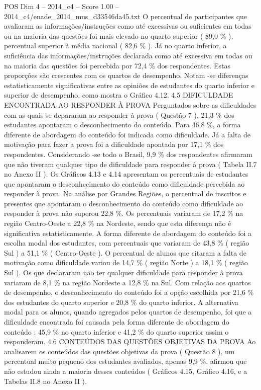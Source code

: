 \begin{textsample}{POS Dim 4 – 2014\_c4 – Score 1.00 – 2014\_c4/enade\_2014\_mus\_d33546da45.txt}
O percentual de participantes que avaliaram as informações/instruções como até excessivas ou suficientes em todas ou na maioria das questões foi mais elevado no quarto superior ( 89,0 \% ), percentual superior à média nacional ( 82,6 \% ).
Já no quarto inferior, a suficiência das informações/instruções declarada como até excessiva em todas ou na maioria das questões foi percebida por 72,4 \% dos respondentes.
Estas proporções são crescentes com os quartos de desempenho.
Notam -se diferenças estatisticamente significativas entre as opiniões de estudantes do quarto inferior e superior de desempenho, como mostra o Gráfico 4.12. 4.5 DIFICULDADE ENCONTRADA AO RESPONDER À PROVA Perguntados sobre as dificuldades com as quais se depararam ao responder à prova ( Questão 7 ), 21,3 \% dos estudantes apontaram o desconhecimento do conteúdo.
Para 46,8 \%, a forma diferente de abordagem do conteúdo foi indicada como dificuldade.
Já a falta de motivação para fazer a prova foi a dificuldade apontada por 17,1 \% dos respondentes.
Considerando -se todo o Brasil, 9,9 \% dos respondentes afirmaram que não tiveram qualquer tipo de dificuldade para responder à prova ( Tabela II.7 no Anexo II ).
Os Gráficos 4.13 e 4.14 apresentam os percentuais de estudantes que apontaram o desconhecimento do conteúdo como dificuldade percebida ao responder à prova.
Na análise por Grandes Regiões, o percentual de inscritos e presentes que apontaram o desconhecimento do conteúdo como dificuldade ao responder à prova não superou 22,8 \%.
Os percentuais variaram de 17,2 \% na região Centro-Oeste a 22,8 \% na Nordeste, sendo que esta diferença não é significativa estatisticamente.
A forma diferente de abordagem do conteúdo foi a escolha modal dos estudantes, com percentuais que variaram de 43,8 \% ( região Sul ) a 51,1 \% ( Centro-Oeste ).
O percentual de alunos que citaram a falta de motivação como dificuldade variou de 14,7 \% ( região Norte ) a 18,1 \% ( região Sul ).
Os que declararam não ter qualquer dificuldade para responder à prova variaram de 8,1 \% na região Nordeste a 12,8 \% na Sul.
Com relação aos quartos de desempenho, o desconhecimento do conteúdo foi a opção escolhida por 21,6 \% dos estudantes do quarto superior e 20,8 \% do quarto inferior.
A alternativa modal para os alunos, quando agregados pelos quartos de desempenho, foi que a dificuldade encontrada foi causada pela forma diferente de abordagem do conteúdo : 45,9 \% no quarto inferior e 41,2 \% do quarto superior assim o responderam. 4.6 CONTEÚDOS DAS QUESTÕES OBJETIVAS DA PROVA Ao analisarem os conteúdos das questões objetivas da prova ( Questão 8 ), um percentual muito pequeno dos estudantes avaliados, apenas 9,9 \%, afirmou que não estudou ainda a maioria desses conteúdos ( Gráficos 4.15, Gráfico 4.16, e a Tabelas II.8 no Anexo II ).

\end{textsample}
